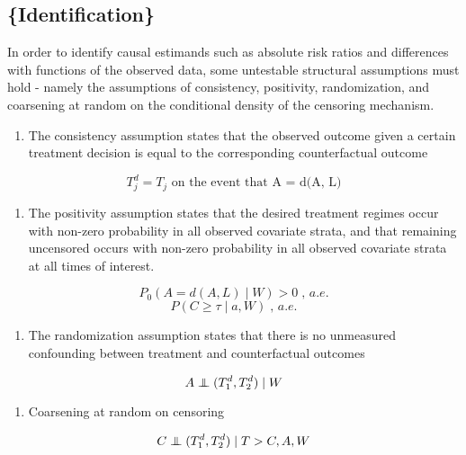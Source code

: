 \documentclass{report}
\newcommand{\1}{\ensuremath{\mathbf{1}}}
\newcommand{\indep}{\ensuremath{\perp\hspace*{-1.4ex}\perp}}
\renewcommand{\L}{\ensuremath{W}}
\begin{document}
\subsection{\{Identification\}}
\label{sec:orgb6a9c11}
In order to identify causal estimands such as absolute risk ratios and differences with functions of the observed data, some untestable structural assumptions must hold - namely the assumptions of consistency, positivity, randomization, and coarsening at random on the conditional density of the censoring mechanism. 

\begin{enumerate}
\item The consistency assumption states that the observed outcome given a certain treatment decision is equal to the corresponding counterfactual outcome
\end{enumerate}
\[ T^d_j = T_j \text{ on the event that A = d(A, L)} \]

\begin{enumerate}
\item The positivity assumption states that the desired treatment regimes occur with non-zero probability in all observed covariate strata, and that remaining uncensored occurs with non-zero probability in all observed covariate strata at all times of interest.
\end{enumerate}
\[ P_0\left( A = d(A, L) \mid \L \right) > 0 \;,\, a.e. \]
\[ P(C \geq \tau \mid a, \L) \;,\, a.e. \]

\begin{enumerate}
\item The randomization assumption states that there is no unmeasured confounding between treatment and counterfactual outcomes
\end{enumerate}
\[ A \indep (T^d_1, T^d_2) \mid \L \]

\begin{enumerate}
\item Coarsening at random on censoring
\end{enumerate}
\[ C \indep (T^d_1, T^d_2) \mid T > C, A, \L \]
\end{document}
